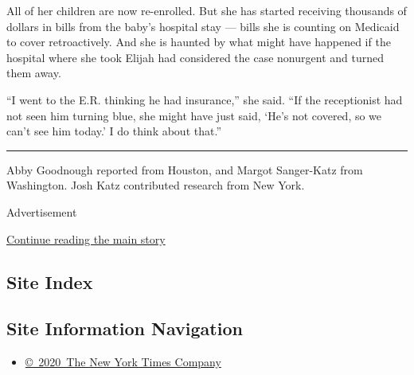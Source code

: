 All of her children are now re-enrolled. But she has started receiving
thousands of dollars in bills from the baby's hospital stay --- bills
she is counting on Medicaid to cover retroactively. And she is haunted
by what might have happened if the hospital where she took Elijah had
considered the case nonurgent and turned them away.

``I went to the E.R. thinking he had insurance,'' she said. ``If the
receptionist had not seen him turning blue, she might have just said,
`He's not covered, so we can't see him today.' I do think about that.''

\begin{center}\rule{0.5\linewidth}{\linethickness}\end{center}

Abby Goodnough reported from Houston, and Margot Sanger-Katz from
Washington. Josh Katz contributed research from New York.

Advertisement

\protect\hyperlink{after-bottom}{Continue reading the main story}

\hypertarget{site-index}{%
\subsection{Site Index}\label{site-index}}

\hypertarget{site-information-navigation}{%
\subsection{Site Information
Navigation}\label{site-information-navigation}}

\begin{itemize}
\tightlist
\item
  \href{https://help.nytimes3xbfgragh.onion/hc/en-us/articles/115014792127-Copyright-notice}{©~2020~The
  New York Times Company}
\end{itemize}

